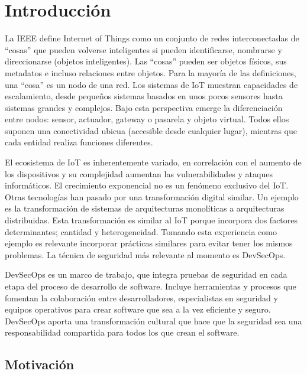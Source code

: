 \chapter{Introducción}
La IEEE define Internet of Things como un conjunto de redes interconectadas de “cosas” que pueden volverse inteligentes si pueden identificarse, nombrarse y direccionarse (objetos inteligentes). Las “cosas” pueden ser objetos físicos, sus metadatos e incluso relaciones entre objetos. Para la mayoría de las definiciones, una “cosa” es un nodo de una red. Los sistemas de IoT muestran capacidades de escalamiento, desde pequeños sistemas basados en unos pocos sensores hasta sistemas grandes y complejos. Bajo esta perspectiva emerge la diferenciación entre nodos: sensor, actuador, gateway o pasarela y objeto virtual. Todos ellos suponen una conectividad ubicua (accesible desde cualquier lugar), mientras que cada entidad realiza funciones diferentes.\cite{IEEE2015}

El ecosistema de IoT es inherentemente variado, en correlación con el aumento de los dispositivos y su complejidad aumentan las vulnerabilidades y ataques informáticos. 
El crecimiento exponencial no es un fenómeno exclusivo del IoT. Otras tecnologías han pasado por una transformación digital similar. Un ejemplo es la transformación de sistemas de arquitecturas monolíticas a arquitecturas distribuidas. Esta transformación es similar al IoT porque incorpora dos factores determinantes; cantidad y heterogeneidad. Tomando esta experiencia como ejemplo es relevante incorporar prácticas similares para evitar tener los mismos problemas. La técnica de seguridad más relevante al momento es DevSecOps.\cite{RedHat2023}

DevSecOps es un marco de trabajo, que integra pruebas de seguridad en cada etapa del proceso de desarrollo de software. Incluye herramientas y procesos que fomentan la colaboración entre desarrolladores, especialistas en seguridad y equipos operativos para crear software que sea a la vez eficiente y seguro. DevSecOps aporta una transformación cultural que hace que la seguridad sea una responsabilidad compartida para todos los que crean el software.

\section{Motivación}

